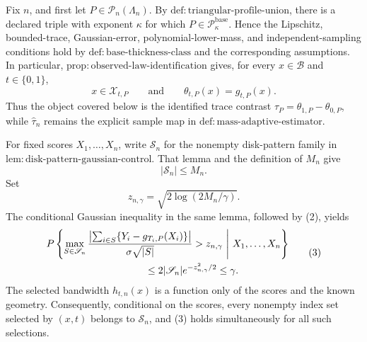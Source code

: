 Fix \(n\), and first let \(P\in\mathcal P_n(\Lambda_n)\). By \(\mathrm{def:triangular\text{-}profile\text{-}union}\), there is a declared triple with exponent \(\kappa\) for which \(P\in\mathcal P_{\kappa}^{\mathrm{base}}\). Hence the Lipschitz, bounded-trace, Gaussian-error, polynomial-lower-mass, and independent-sampling conditions hold by \(\mathrm{def:base\text{-}thickness\text{-}class}\) and the corresponding assumptions. In particular, \(\mathrm{prop:observed\text{-}law\text{-}identification}\) gives, for every \(x\in\mathcal B\) and \(t\in\{0,1\}\),
\[
x\in\mathcal X_{t,P}
\qquad\text{and}\qquad
\theta_{t,P}(x)=g_{t,P}(x). \tag{1}
\]
Thus the object covered below is the identified trace contrast \(\tau_P=\theta_{1,P}-\theta_{0,P}\), while \(\widehat\tau_n\) remains the explicit sample map in \(\mathrm{def:mass\text{-}adaptive\text{-}estimator}\).

For fixed scores \(X_1,\ldots,X_n\), write \(\mathscr S_n\) for the nonempty disk-pattern family in \(\mathrm{lem:disk\text{-}pattern\text{-}gaussian\text{-}control}\). That lemma and the definition of \(M_n\) give
\[
|\mathscr S_n|\le M_n. \tag{2}
\]
Set
\[
z_{n,\gamma}=\sqrt{2\log(2M_n/\gamma)}.
\]
The conditional Gaussian inequality in the same lemma, followed by (2), yields
\[
\begin{aligned}
&P\left\{
\max_{S\in\mathscr S_n}
\frac{\left|\sum_{i\in S}\{Y_i-g_{T_i,P}(X_i)\}\right|}
{\sigma\sqrt{|S|}}>z_{n,\gamma}
\ \middle|\ X_1,\ldots,X_n\right\}\\
&\hspace{35mm}\le 2|\mathscr S_n|e^{-z_{n,\gamma}^2/2}
\le\gamma.
\end{aligned}\tag{3}
\]
The selected bandwidth \(\widehat h_{t,n}(x)\) is a function only of the scores and the known geometry. Consequently, conditional on the scores, every nonempty index set selected by \((x,t)\) belongs to \(\mathscr S_n\), and (3) holds simultaneously for all such selections.

